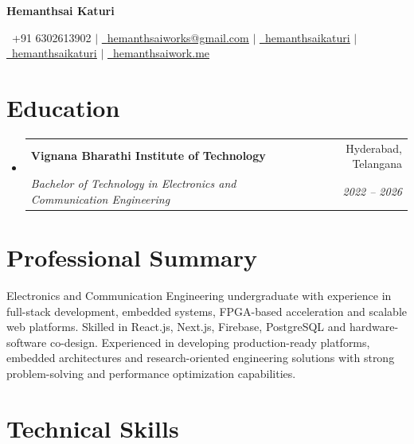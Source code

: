 \documentclass[letterpaper,11pt]{article}
\makeatletter
\newcommand{\resumeSubheading}[4]{
  \vspace{-1pt}\item
  \begin{tabular*}{0.97\textwidth}[t]{l@{\extracolsep{\fill}}r}
    \textbf{#1} & #2 \\
    \textit{\small#3} & \textit{\small #4} \\
  \end{tabular*}\vspace{-6pt}
}
\newcommand{\resumeSubHeadingListStart}{\begin{itemize}[leftmargin=0.15in, label={}]}
\newcommand{\resumeSubHeadingListEnd}{\end{itemize}}
\makeatother
\begin{document}

\begin{center}
{\Huge \bfseries Hemanthsai Katuri} \\ \vspace{4pt}

\small
\faPhone\ +91 6302613902 $|$
\href{mailto:hemanthsaiworks@gmail.com}{\faEnvelope\ \underline{hemanthsaiworks@gmail.com}} $|$
\href{https://www.linkedin.com/in/hemanthsaikaturi/}{\faLinkedin\ \underline{hemanthsaikaturi}} $|$
\href{https://github.com/hemanthsaikaturi}{\faGithub\ \underline{hemanthsaikaturi}} $|$
\href{https://www.hemanthsaiwork.me/}{\faGlobe\ \underline{hemanthsaiwork.me}}

\end{center}


\section{Education}

\resumeSubHeadingListStart

\resumeSubheading
{Vignana Bharathi Institute of Technology}{Hyderabad, Telangana}
{Bachelor of Technology in Electronics and Communication Engineering}{2022 -- 2026}

\resumeSubHeadingListEnd


\section{Professional Summary}

\small{
Electronics and Communication Engineering undergraduate with experience in full-stack development, embedded systems, FPGA-based acceleration and scalable web platforms. Skilled in React.js, Next.js, Firebase, PostgreSQL and hardware-software co-design. Experienced in developing production-ready platforms, embedded architectures and research-oriented engineering solutions with strong problem-solving and performance optimization capabilities.
}

\vspace{-4pt}


\section{Technical Skills}
\end{document}
